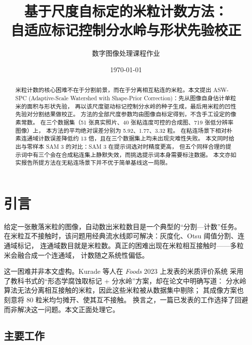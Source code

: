\documentclass[12pt, a4paper]{ctexart}
\title{基于尺度自标定的米粒计数方法：\\自适应标记控制分水岭与形状先验校正}
\author{数字图像处理课程作业}
\date{\today}
\begin{document}
\maketitle

\begin{abstract}
米粒计数的核心困难不在于分割前景，而在于分离相互粘连的米粒。本文提出 ASW-SPC
(Adaptive-Scale Watershed with Shape-Prior Correction)：先从图像自身估计单粒米的面积与形状先验，
再以该尺度驱动标记控制分水岭的种子生成，最后用米粒的凹性先验对分割结果做校正。
方法的全部尺度参数均由图像自标定得到，不含手工设定的像素常数。
在三个数据集（51 张真实照片、40 张粘连度可控的合成图、719 张低分辨率图像）上，
本方法的平均绝对误差分别为 5.92、1.77、3.32 粒。
在粘连场景下相对朴素连通域计数误差降低约 13 倍，且在三个数据集上均未出现灾难性失败。
本文同时给出与零样本 SAM 3 的对比：SAM 3 在提示词选对时精度更高，
但五个同样合理的提示词中有三个会在合成粘连集上静默失效，而挑选提示词本身需要标注数据。
本文亦如实报告所提方法在无粘连场景下并不优于简单基线这一局限。
\end{abstract}

\section{引言}

给定一张散落米粒的图像，自动数出米粒数目是一个典型的“分割—计数”任务。
在米粒互不接触时，该问题用经典流水线即可解决：灰度化、Otsu 阈值分割、连通域标记，
连通域数目就是米粒数。真正的困难出现在米粒相互接触时——多粒米会融合成一个连通域，
计数随之系统性偏低。

这一困难并非本文虚构。Kurade 等人在 \emph{Foods} 2023 上发表的米质评价系统\cite{kurade2023}
采用了教科书式的“形态学腐蚀取标记 + 分水岭”方案，却在论文中明确写道：
分水岭算法无法分离相互接触的米粒，因此这些米粒被从数据集中剔除；
其成像方案也刻意将 80 粒米均匀摊开、使其互不接触。
换言之，一篇已发表的工作选择了回避而非解决这一问题。本文正面处理它。

\subsection{主要工作}
\end{document}
